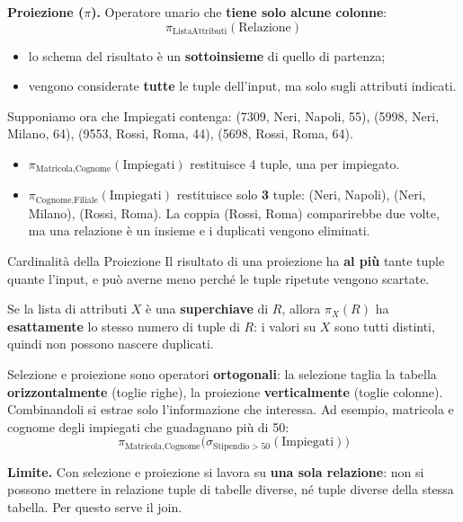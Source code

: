 \documentclass[12pt]{extarticle}
\begin{document}
\medskip
\noindent \textbf{Proiezione ($\pi$).} Operatore unario che \textbf{tiene solo alcune colonne}:
\[
\pi_{\text{ListaAttributi}}(\text{Relazione})
\]
\begin{itemize}
    \item lo schema del risultato è un \textbf{sottoinsieme} di quello di partenza;
    \item vengono considerate \textbf{tutte} le tuple dell'input, ma solo sugli attributi indicati.
\end{itemize}

\noindent Supponiamo ora che Impiegati contenga: (7309, Neri, Napoli, 55), (5998, Neri, Milano, 64), (9553, Rossi, Roma, 44), (5698, Rossi, Roma, 64).
\begin{itemize}
    \item $\pi_{\text{Matricola}, \text{Cognome}}(\text{Impiegati})$ restituisce 4 tuple, una per impiegato.
    \item $\pi_{\text{Cognome}, \text{Filiale}}(\text{Impiegati})$ restituisce solo \textbf{3} tuple: (Neri, Napoli), (Neri, Milano), (Rossi, Roma). La coppia (Rossi, Roma) comparirebbe due volte, ma una relazione è un insieme e i duplicati vengono eliminati.
\end{itemize}

\begin{cbox}{Cardinalità della Proiezione}
\noindent Il risultato di una proiezione ha \textbf{al più} tante tuple quante l'input, e può averne meno perché le tuple ripetute vengono scartate.

\medskip
\noindent Se la lista di attributi $X$ è una \textbf{superchiave} di $R$, allora $\pi_X(R)$ ha \textbf{esattamente} lo stesso numero di tuple di $R$: i valori su $X$ sono tutti distinti, quindi non possono nascere duplicati.
\end{cbox}

\noindent Selezione e proiezione sono operatori \textbf{ortogonali}: la selezione taglia la tabella \textbf{orizzontalmente} (toglie righe), la proiezione \textbf{verticalmente} (toglie colonne). Combinandoli si estrae solo l'informazione che interessa. Ad esempio, matricola e cognome degli impiegati che guadagnano più di 50:
\[
\pi_{\text{Matricola}, \text{Cognome}}\big(\sigma_{\text{Stipendio} > 50}(\text{Impiegati})\big)
\]

\medskip
\noindent \textbf{Limite.} Con selezione e proiezione si lavora su \textbf{una sola relazione}: non si possono mettere in relazione tuple di tabelle diverse, né tuple diverse della stessa tabella. Per questo serve il join.
\end{document}
